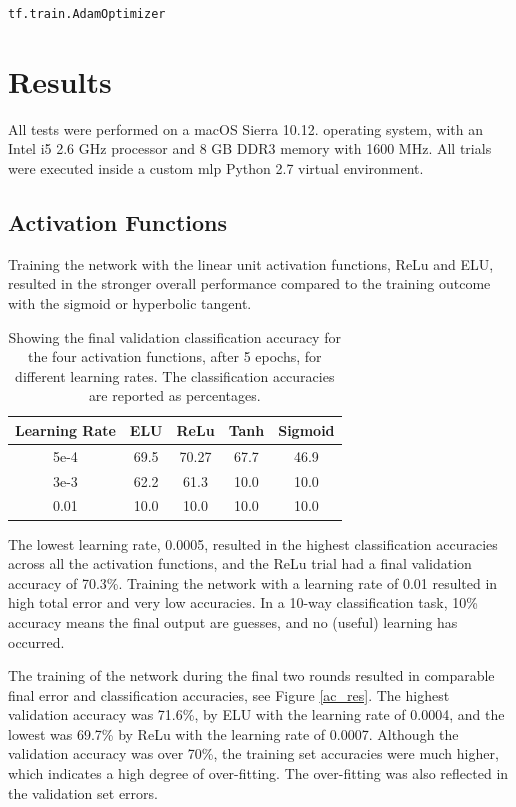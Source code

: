 \documentclass[]{article}
\begin{document}
\texttt{tf.train.AdamOptimizer}
 
\section{Results}

All tests were performed on a macOS Sierra 10.12. operating system, with an Intel i5 2.6 GHz processor and 8 GB DDR3 memory with 1600 MHz. All trials were executed inside a custom mlp Python 2.7 virtual environment. 

\subsection{Activation Functions}

Training the network with the linear unit activation functions, ReLu and ELU, resulted in the stronger overall performance compared to the training outcome with the sigmoid or hyperbolic tangent. 

\begin{table}[h]
	\centering
	\caption{Showing the final validation classification accuracy  for the four activation functions, after 5 epochs, for different learning rates. The classification accuracies are reported as percentages.}
	\label{ac-table}
	\begin{tabular}{@{}c|cccc@{}}
		\toprule
		Learning Rate & ELU & ReLu & Tanh & Sigmoid \\ \midrule
		5e-4 & 69.5 & 70.27 & 67.7 & 46.9 \\
		3e-3 & 62.2 & 61.3 & 10.0 & 10.0 \\
		0.01 & 10.0 & 10.0 & 10.0 & 10.0 \\ \bottomrule
	\end{tabular}
\end{table}

The lowest learning rate, 0.0005, resulted in the highest classification accuracies across all the activation functions, and the ReLu trial had a final validation accuracy of 70.3\%. Training the network with a learning rate of 0.01 resulted in high total error and very low accuracies. In a 10-way classification task, 10\% accuracy means the final output are guesses, and no (useful) learning has occurred.

The training of the network during the final two rounds resulted in comparable final error and classification accuracies, see Figure \ref{ac_res}. The highest validation accuracy was 71.6\%, by ELU with the learning rate of 0.0004, and the lowest was 69.7\% by ReLu with the learning rate of 0.0007. Although the validation accuracy was over 70\%, the training set accuracies were much higher, which indicates a high degree of over-fitting. The over-fitting was also reflected in the validation set errors.
\end{document}
